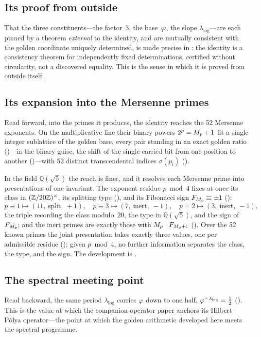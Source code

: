 \subsection*{Its proof from outside}
That the three constituents---the factor~$3$, the base~$\varphi$, the slope
$\lambda_{\log}$---are each pinned by a theorem \emph{external} to the
identity, and are mutually consistent with the golden coordinate uniquely
determined, is made precise in : the identity is
a consistency theorem for independently fixed determinations, certified
without circularity, not a discovered equality.  This is the sense in which
it is proved from outside itself.

\subsection*{Its expansion into the Mersenne primes}
Read forward, into the primes it produces, the identity reaches the 52
Mersenne exponents.  On the multiplicative line their binary powers
$2^{p}=M_{p}+1$ fit a single integer sublattice of the golden base, every pair
standing in an exact golden ratio ()---in the binary
guise, the shift of the single carried bit from one position to another
()---with 52 distinct transcendental indices $\sigma(p_{i})$
().

In the field $\mathbb{Q}(\sqrt5)$ the reach is finer, and it resolves each
Mersenne prime into presentations of one invariant.  The exponent residue
$p\bmod4$ fixes at once its class in $(\mathbb{Z}/20\mathbb{Z})^{\times}$, its splitting type
(), and its Fibonacci sign $F_{M_{p}}\equiv\pm1$
():
\[
  p\equiv1\mapsto(11,\ \mathrm{split},\ +1),\quad
  p\equiv3\mapsto(7,\ \mathrm{inert},\ -1),\quad
  p=2\mapsto(3,\ \mathrm{inert},\ -1),
\]
the triple recording the class modulo~$20$, the type in $\mathbb{Q}(\sqrt5)$,
and the sign of $F_{M_{p}}$; and the inert primes are exactly those with
$M_{p}\mid F_{M_{p}+1}$ ().  Over the 52 known primes the
joint presentation takes exactly three values, one per admissible residue
(); given $p\bmod4$, no further information separates the
class, the type, and the sign.  The development is .

\subsection*{The spectral meeting point}
Read backward, the same period $\lambda_{\log}$ carries $\varphi$ down to
one half, $\varphi^{-\lambda_{\log}}=\tfrac12$ ().  This
is the value at which the companion operator paper anchors its
Hilbert--P\'olya operator---the point at which the golden arithmetic
developed here meets the spectral programme.

